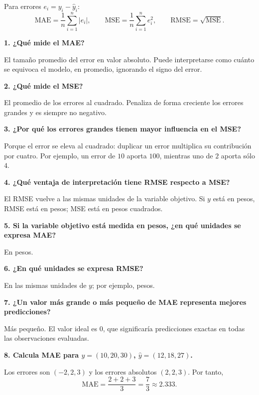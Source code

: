\documentclass[11pt]{article}
\newcommand{\pregunta}[1]{\vspace{2mm}\textbf{#1}}
\begin{document}
Para errores $e_i=y_i-\hat y_i$:
\[
\mathrm{MAE}=\frac1n\sum_{i=1}^n |e_i|,\qquad
\mathrm{MSE}=\frac1n\sum_{i=1}^n e_i^2,\qquad
\mathrm{RMSE}=\sqrt{\mathrm{MSE}}.
\]

\pregunta{1. ¿Qué mide el MAE?}
\begin{respuesta}
El tamaño promedio del error en valor absoluto. Puede interpretarse como cuánto se equivoca el modelo, en promedio, ignorando el signo del error.
\end{respuesta}

\pregunta{2. ¿Qué mide el MSE?}
\begin{respuesta}
El promedio de los errores al cuadrado. Penaliza de forma creciente los errores grandes y es siempre no negativo.
\end{respuesta}

\pregunta{3. ¿Por qué los errores grandes tienen mayor influencia en el MSE?}
\begin{respuesta}
Porque el error se eleva al cuadrado: duplicar un error multiplica su contribución por cuatro. Por ejemplo, un error de $10$ aporta $100$, mientras uno de $2$ aporta sólo $4$.
\end{respuesta}

\pregunta{4. ¿Qué ventaja de interpretación tiene RMSE respecto a MSE?}
\begin{respuesta}
El RMSE vuelve a las mismas unidades de la variable objetivo. Si $y$ está en pesos, RMSE está en pesos; MSE está en pesos cuadrados.
\end{respuesta}

\pregunta{5. Si la variable objetivo está medida en pesos, ¿en qué unidades se expresa MAE?}
\begin{respuesta}
En pesos.
\end{respuesta}

\pregunta{6. ¿En qué unidades se expresa RMSE?}
\begin{respuesta}
En las mismas unidades de $y$; por ejemplo, pesos.
\end{respuesta}

\pregunta{7. ¿Un valor más grande o más pequeño de MAE representa mejores predicciones?}
\begin{respuesta}
Más pequeño. El valor ideal es $0$, que significaría predicciones exactas en todas las observaciones evaluadas.
\end{respuesta}

\pregunta{8. Calcula MAE para $y=(10,20,30)$, $\hat y=(12,18,27)$.}
\begin{respuesta}
Los errores son $(-2,2,3)$ y los errores absolutos $(2,2,3)$. Por tanto,
\[
\mathrm{MAE}=\frac{2+2+3}{3}=\frac73\approx 2.333.
\]
\end{respuesta}
\end{document}
